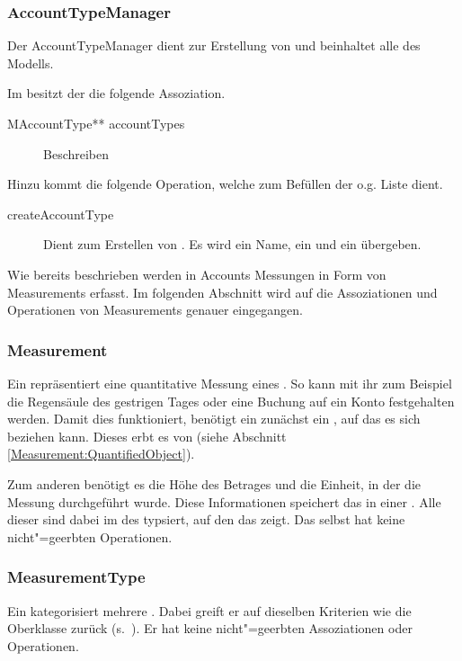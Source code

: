 \subsubsection{AccountTypeManager}
Der AccountTypeManager dient zur Erstellung von  und beinhaltet alle  des Modells.

Im \MM besitzt der  die folgende Assoziation.
\begin{description}
	\item[MAccountType** accountTypes] Beschreiben
\end{description}

Hinzu kommt die folgende Operation, welche zum Befüllen der o.g. Liste dient.
\begin{description}
	\item[createAccountType] Dient zum Erstellen von . 
	Es wird ein Name, ein  und ein  übergeben.
\end{description}

Wie bereits beschrieben werden in Accounts Messungen in Form von Measurements erfasst. 
Im folgenden Abschnitt wird auf die Assoziationen und Operationen von Measurements genauer eingegangen.


\subsubsection{Measurement}
Ein  repräsentiert eine quantitative Messung eines . So kann mit ihr zum Beispiel die Regensäule des gestrigen Tages
oder eine Buchung auf ein Konto festgehalten werden. Damit dies funktioniert, benötigt ein  zunächst ein , auf das es
sich beziehen kann. Dieses erbt es von  (siehe Abschnitt \ref{Measurement:QuantifiedObject}).

Zum anderen benötigt es die Höhe des Betrages und die Einheit, in der die Messung durchgeführt wurde. Diese Informationen speichert das 
in einer . Alle  dieser  sind dabei im  des  typsiert,
auf den das  zeigt. Das  selbst hat keine nicht"=geerbten Operationen.


\subsubsection{MeasurementType}
Ein  kategorisiert mehrere . Dabei greift er auf dieselben Kriterien wie die Oberklasse 
zurück (s.~). Er hat keine nicht"=geerbten Assoziationen oder Operationen.


